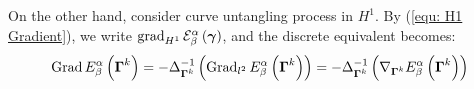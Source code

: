 \documentclass[../dissertation.tex]{subfiles}
\begin{document}
On the other hand, consider curve untangling process in $H^1$.
By (\ref{equ: H1 Gradient}), we write $\operatorname{grad}_{H^1} \mathcal{E}_{\beta}^{\alpha} \left( \boldsymbol{\gamma} \right)$,
and the discrete equivalent becomes:
\begin{equation}
    \operatorname{Grad} E_{\beta}^{\alpha} \left( \boldsymbol{\Gamma}^k \right) = - \Delta^{-1}_{\boldsymbol{\Gamma}^k} \left( \operatorname{Grad}_{l^2} E_{\beta}^{\alpha} \left( \boldsymbol{\Gamma}^k \right) \right) = -\Delta^{-1}_{\boldsymbol{\Gamma}^k} \left( \nabla_{\boldsymbol{\Gamma}^k} E_{\beta}^{\alpha} \left( \boldsymbol{\Gamma}^k \right) \right)
\end{equation}


\end{document}
